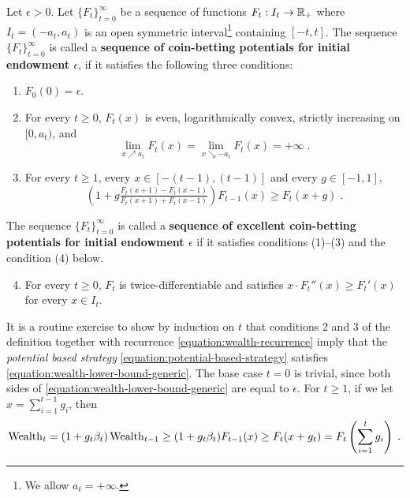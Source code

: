 \begin{definition}
\label{definition:potential}
Let $\epsilon > 0$. Let $\{F_t\}_{t=0}^\infty$ be a sequence of functions
$F_t:I_t  \to \mathbb{R}_+$ where $I_t = (-a_t, a_t)$ is an open symmetric
interval\footnote{We allow $a_t = +\infty$.} containing $[-t,t]$.  The sequence
$\{F_t\}_{t=0}^\infty$ is called a \textbf{sequence of coin-betting potentials
for initial endowment $\epsilon$}, if it satisfies the following three
conditions:
\begin{enumerate}[(1)]
\item $F_0(0) = \epsilon$.

\item For every $t \ge 0$, $F_t(x)$ is even, logarithmically convex, strictly
increasing on $[0,a_t)$, and
\begin{equation}
\label{equation:potential-limit-assumption}
\lim_{x \nearrow a_t} F_t(x) = \lim_{x \searrow -a_t} F_t(x) = +\infty \; .
\end{equation}

\item For every $t \ge 1$, every $x \in [-(t-1), (t-1)]$ and every $g \in [-1,1]$,
$$
\left(1 + g \tfrac{F_t(x + 1) - F_t(x - 1)}{F_t(x + 1) + F_t(x - 1)} \right) F_{t-1}(x) \ge F_t(x+g) \; .
$$
\end{enumerate}
The sequence $\{F_t\}_{t=0}^\infty$ is called a
\textbf{sequence of excellent coin-betting potentials for initial
endowment $\epsilon$} if it satisfies conditions (1)--(3) and the condition (4)
below.
\begin{enumerate}[(1)]
\setcounter{enumi}{3}
\item For every $t \ge 0$, $F_t$ is twice-differentiable and
satisfies $x \cdot F_t''(x) \ge F_t'(x)$ for every $x \in I_t$.
\end{enumerate}
\end{definition}

It is a routine exercise to show by induction on $t$ that conditions 2 and 3 of
the definition together with recurrence \eqref{equation:wealth-recurrence} imply
that the \emph{potential based strategy}
\eqref{equation:potential-based-strategy} satisfies
\eqref{equation:wealth-lower-bound-generic}. The base case $t=0$ is trivial,
since both sides of \eqref{equation:wealth-lower-bound-generic} are equal to
$\epsilon$. For $t \ge 1$, if we let $x = \sum_{i=1}^{t-1} g_i$, then
$$
\operatorname{Wealth}_t
= (1+g_t \beta_t) \operatorname{Wealth}_{t-1}
\ge (1 + g_t \beta_t) F_{t-1}(x)
\ge F_t(x + g_t)
= F_t \left( \sum_{i=1}^t g_i \right) \; .
$$

